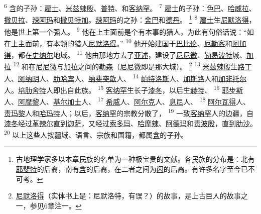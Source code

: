\textsuperscript{6}
\uline{含}的子孙：\uline{雇士}、\uline{米兹辣殷}、\uline{普特}、和\uline{客纳罕}。
\textsuperscript{7}
\uline{雇士}的子孙：\uline{色巴}、\uline{哈威拉}、\uline{撒贝拉}、\uline{辣阿玛}和\uline{撒贝特加}。\uline{辣阿玛}的之孙：\uline{舍巴}和\uline{德丹}。
\footnote{古地理学家多以本章民族的名单为一种极宝贵的文献。各民族的分布是：北有\uline{耶斐特}的后裔，南有\uline{含}的后裔，在二者之间为\uline{闪}的后裔。有许多名字至今已不可考。}
\textsuperscript{8}
\uline{雇士}生\uline{尼默洛得}，他是世上第一个强人。
\textsuperscript{9}
他在上主面前是个有本事的猎人，为此有句俗话说：“如在上主面前，有本领的猎人\uline{尼默洛得}。”
\textsuperscript{10}
他开始建国于\uline{巴比伦}、\uline{厄勒客}和\uline{阿加得}，都在\uline{史纳尔}地域。
\textsuperscript{11}
他由那地方去了\uline{亚述}，建设了\uline{尼尼微}、\uline{勒曷波特}城、\uline{加拉}
\textsuperscript{12}
和在\uline{尼尼微}与\uline{加拉}之间的\uline{勒森}（\uline{尼尼微}即是那大城）。
\footnote{\uline{尼默洛得}（实体书上是：尼默洛特，有误？）的故事，是上古巨人的故事之一，参见6章注一。}
\textsuperscript{13}
\uline{米兹辣殷}生\uline{路丁}人、\uline{阿纳明}人、\uline{肋哈宾}人、\uline{纳斐突歆}人、
\textsuperscript{14}
\uline{帕特洛斯}人、\uline{加斯路}人和\uline{加非}\uline{托尔}人。\uline{培肋}\uline{舍特}人即出自此族。
\textsuperscript{15}
\uline{客纳罕}生长子\uline{漆冬}，以后生\uline{赫特}、
\textsuperscript{16}
\uline{耶步斯}人、\uline{阿摩黎}人、\uline{基尔加}\uline{士}人、
\textsuperscript{17}
\uline{希威}人、\uline{阿尔克}人、\uline{息尼}人、
\textsuperscript{18}
\uline{阿尔瓦得}人、\uline{责玛}\uline{黎}人和\uline{哈玛}\uline{特}人；以后，\uline{客纳罕}的宗教分散了，
\textsuperscript{19}
一致\uline{客纳罕}人的边疆，自\uline{漆冬}经过\uline{革辣尔}直到\uline{迦萨}，又经过\uline{索多玛}、\uline{哈摩辣}、\uline{阿德玛}和\uline{责波殷}，直到\uline{肋沙}。
\textsuperscript{20}
以上这些人按疆域、语言、宗族和国籍，都属\uline{含}的子孙。

